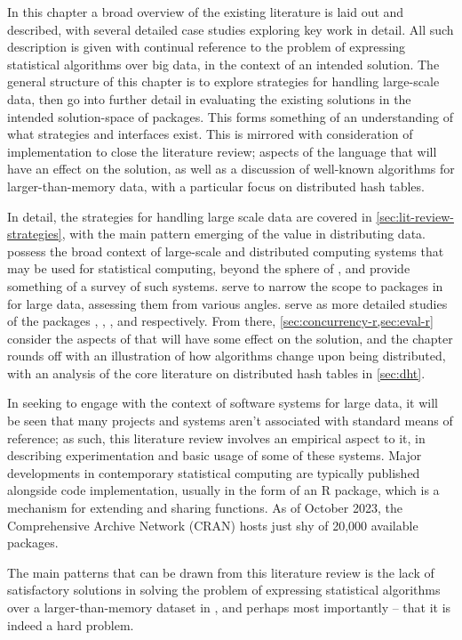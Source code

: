 In this chapter a broad overview of the existing literature is laid out and described, with several detailed case studies exploring key work in detail.
All such description is given with continual reference to the problem of expressing statistical algorithms over big data, in the context of an intended \lsr{} solution.
The general structure of this chapter is to explore strategies for handling large-scale data, then go into further detail in evaluating the existing solutions in the intended solution-space of \R{} packages.
This forms something of an understanding of what strategies and interfaces exist.
This is mirrored with consideration of implementation to close the literature review; aspects of the \R{} language that will have an effect on the solution, as well as a discussion of well-known algorithms for larger-than-memory data, with a particular focus on distributed hash tables.

In detail, the strategies for handling large scale data are covered in \cref{sec:lit-review-strategies}, with the main pattern emerging of the value in distributing data.
 possess the broad context of large-scale and distributed computing systems that may be used for statistical computing, beyond the sphere of \R{}, and provide something of a survey of such systems.
 serve to narrow the scope to packages in \R{} for large data, assessing them from various angles.
 serve as more detailed studies of the \R{} packages , , , and  respectively.
From there, \cref{sec:concurrency-r,sec:eval-r} consider the aspects of \R{} that will have some effect on the solution, and the chapter rounds off with an illustration of how algorithms change upon being distributed, with an analysis of the core literature on distributed hash tables in \cref{sec:dht}.

In seeking to engage with the context of software systems for large data, it will be seen that many projects and systems aren't associated with standard means of reference; as such, this literature review involves an empirical aspect to it, in describing experimentation and basic usage of some of these systems.
Major developments in contemporary statistical computing are typically published alongside \R{} code implementation, usually in the form of an R package, which is a mechanism for extending \R{} and sharing functions.
As of October 2023, the Comprehensive \R{} Archive Network (CRAN) hosts just shy of 20,000 available packages\cite{team20:_r}.

The main patterns that can be drawn from this literature review is the lack of satisfactory solutions in solving the problem of expressing statistical algorithms over a larger-than-memory dataset in \R{}, and perhaps most importantly -- that it is indeed a hard problem.
